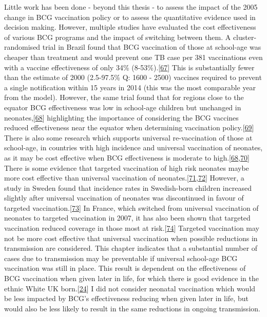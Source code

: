 \documentclass[11pt,twoside]{bristolthesis}
\begin{document}
  Little work has been done - beyond this thesis - to assess the impact of the 2005 change in BCG vaccination policy or to assess the quantitative evidence used in decision making. However, multiple studies have evaluated the cost effectiveness of various BCG programs and the impact of switching between them. A cluster-randomised trial in Brazil found that BCG vaccination of those at school-age was cheaper than treatment and would prevent one TB case per 381 vaccinations even with a vaccine effectiveness of only 34\% (8-53\%).{[}\protect\hyperlink{ref-Pereira2012}{67}{]} This is substantially fewer than the estimate of 2000 (2.5-97.5\% Q: 1600 - 2500) vaccines required to prevent a single notification within 15 years in 2014 (this was the most comparable year from the model). However, the same trial found that for regions close to the equator BCG effectiveness was low in school-age children but unchanged in neonates,{[}\protect\hyperlink{ref-Barreto2014a}{68}{]} highlighting the importance of considering the BCG vaccines reduced effectiveness near the equator when determining vaccination policy.{[}\protect\hyperlink{ref-Fine1995}{69}{]} There is also some research which supports universal re-vaccination of those at school-age, in countries with high incidence and universal vaccination of neonates, as it may be cost effective when BCG effectiveness is moderate to high.{[}\protect\hyperlink{ref-Barreto2014a}{68},\protect\hyperlink{ref-Dye2013a}{70}{]} There is some evidence that targeted vaccination of high risk neonates maybe more cost effective than universal vaccination of neonates.{[}\protect\hyperlink{ref-Usher2016}{71},\protect\hyperlink{ref-Hersh2003}{72}{]} However, a study in Sweden found that incidence rates in Swedish-born children increased slightly after universal vaccination of neonates was discontinued in favour of targeted vaccination.{[}\protect\hyperlink{ref-Romanus1992}{73}{]} In France, which switched from universal vaccination of neonates to targeted vaccination in 2007, it has also been shown that targeted vaccination reduced coverage in those most at risk.{[}\protect\hyperlink{ref-Guthmann2011}{74}{]} Targeted vaccination may not be more cost effective that universal vaccination when possible reductions in transmission are considered. This chapter indicates that a substantial number of cases due to transmission may be preventable if universal school-age BCG vaccination was still in place. This result is dependent on the effectiveness of BCG vaccination when given later in life, for which there is good evidence in the ethnic White UK born.{[}\protect\hyperlink{ref-Hart1972}{24}{]} I did not consider neonatal vaccination which would be less impacted by BCG's effectiveness reducing when given later in life, but would also be less likely to result in the same reductions in ongoing transmission.
  
\end{document}
